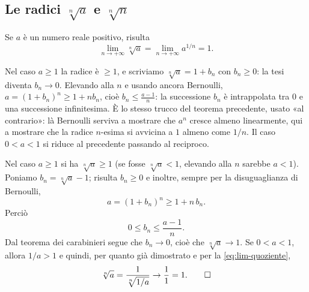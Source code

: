 \subsection{Le radici $\sqrt[n]{a}$ e $\sqrt[n]{n}$}

\begin{proposizione}\label{prop:radice-n-a}
Se $a$ è un numero reale positivo, risulta
\begin{equation}\label{eq:lim-radice-a}
  \lim_{n\to+\infty}\sqrt[n]{a}=\lim_{n\to+\infty}a^{1/n}=1 .
\end{equation}
\end{proposizione}

\begin{schema}
\end{schema}

\begin{strategia}
Nel caso $a\ge1$ la radice è $\ge1$, e scriviamo $\sqrt[n]a=1+b_{n}$ con $b_{n}\ge0$: la
tesi diventa $b_{n}\to0$. Elevando alla $n$ e usando ancora Bernoulli,
$a=(1+b_{n})^{n}\ge1+nb_{n}$, cioè $b_{n}\le\frac{a-1}{n}$: la successione $b_{n}$ è
intrappolata tra $0$ e una successione infinitesima. È lo stesso trucco del teorema
precedente, usato «al contrario»: là Bernoulli serviva a mostrare che $a^{n}$ cresce
almeno linearmente, qui a mostrare che la radice $n$-esima si avvicina a $1$ almeno come
$1/n$. Il caso $0<a<1$ si riduce al precedente passando al reciproco.
\end{strategia}

\begin{dimostrazione}
Nel caso $a\ge1$ si ha $\sqrt[n]a\ge1$ (se fosse $\sqrt[n]a<1$, elevando alla $n$ sarebbe
$a<1$). Poniamo $b_{n}=\sqrt[n]a-1$; risulta $b_{n}\ge0$ e inoltre, sempre per la
disuguaglianza di Bernoulli,
\begin{equation}\label{eq:radice-a-passo}
  a=(1+b_{n})^{n}\ge1+n\,b_{n}.
\end{equation}
Perciò
\begin{equation}\label{eq:radice-a-stima}
  0\le b_{n}\le\frac{a-1}{n}.
\end{equation}
Dal teorema dei carabinieri segue che $b_{n}\to0$, cioè che $\sqrt[n]a\to1$. Se $0<a<1$,
allora $1/a>1$ e quindi, per quanto già dimostrato e per la \eqref{eq:lim-quoziente},
\begin{equation}\label{eq:radice-a-reciproco}
  \sqrt[n]a=\frac{1}{\sqrt[n]{1/a}}\to\frac11=1. \qedhere
\end{equation}
\end{dimostrazione}


